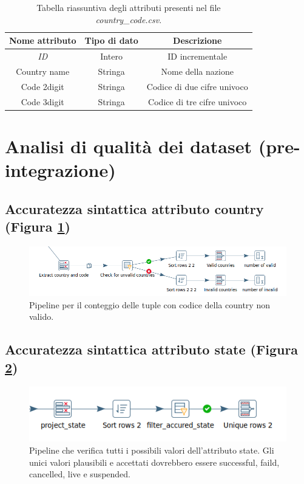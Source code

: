 \begin{table}
	\caption{Tabella riassuntiva degli attributi presenti nel file \textit{country\_code.csv}.}
	
	\label{tab:code}
	
	\centering
	\begin{tabular}{|c|c|c|}
		\hline
		\textbf{Nome attributo} & \textbf{Tipo di dato} & \textbf{Descrizione} \\ 
		\hline  
		\rule{0pt}{13pt}\emph{ID} & Intero & ID incrementale \\ 
		\hline  
		\rule{0pt}{13pt}Country name & Stringa & Nome della nazione \\ 
		\hline  
		\rule{0pt}{13pt}Code 2digit & Stringa & Codice di due cifre univoco \\ 
		\hline  
		\rule{0pt}{13pt}Code 3digit & Stringa & Codice di tre cifre univoco \\ 
		\hline   
	\end{tabular}
\end{table} 

\section{Analisi di qualità dei dataset (pre-integrazione)}

\subsection{Accuratezza sintattica attributo country (Figura \ref{fig:dqcountrycodeaccuracy})}

\begin{figure}[h!]
	\centering
	\includegraphics[width=0.7\linewidth]{images/DQ_countrycodeaccuracy}
	\caption{Pipeline per il conteggio delle tuple con codice della country non valido.}
	\label{fig:dqcountrycodeaccuracy}
\end{figure}

\subsection{Accuratezza sintattica attributo state (Figura \ref{fig:dqstateaccuracy})}

\begin{figure}[h!]
	\centering
	\includegraphics[width=0.7\linewidth]{images/DQ_stateaccuracy}
	\caption{Pipeline che verifica tutti i possibili valori dell'attributo state. Gli unici valori plausibili e accettati dovrebbero essere successful, faild, cancelled, live e suspended.}
	\label{fig:dqstateaccuracy}
\end{figure}


